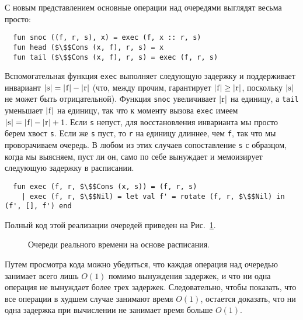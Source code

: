 С новым представлением основные операции над очередями выглядят весьма
просто:
\begin{lstlisting}
  fun snoc ((f, r, s), x) = exec (f, x :: r, s)
  fun head ($\$$Cons (x, f), r, s) = x
  fun tail ($\$$Cons (x, f), r, s) = exec (f, r, s)
\end{lstlisting}
Вспомогательная функция \lstinline!exec! выполняет следующую задержку
и поддерживает инвариант $|\lstinline!s!| = |\lstinline!f!| -
|\lstinline!r!|$ (что, между прочим, гарантирует $|\lstinline!f!| \ge
|\lstinline!r!|$, поскольку $|\lstinline!s!|$ не может быть
отрицательной). Функция \lstinline!snoc! увеличивает $|\lstinline!r!|$
на единицу, а \lstinline!tail! уменьшает $|\lstinline!f!|$ на единицу,
так что к моменту вызова \lstinline!exec! имеем $|\lstinline!s!| =
|\lstinline!f!| - |\lstinline!r!| + 1$. Если \lstinline!s! непуст,
для восстановления инварианта мы просто берем хвост
\lstinline!s!. Если же \lstinline!s! пуст, то \lstinline!r! на
единицу длиннее, чем \lstinline!f!, так что мы проворачиваем
очередь. В любом из этих случаев сопоставление \lstinline!s! с
образцом, когда мы выясняем, пуст ли он, само по себе вынуждает и мемоизирует
следующую задержку в расписании.
\begin{lstlisting}
  fun exec (f, r, $\$$Cons (x, s)) = (f, r, s)
    | exec (f, r, $\$$Nil) = let val f' = rotate (f, r, $\$$Nil) in (f', [], f') end
\end{lstlisting}
Полный код этой реализации очередей приведен на Рис.~\ref{fig:7.1}.

\begin{figure}
  \centering

  \caption{Очереди реального времени на основе расписания.}
  \label{fig:7.1}
\end{figure}

Путем просмотра кода можно убедиться, что каждая операция над очередью
занимает всего лишь $O(1)$ помимо вынуждения задержек, и что ни одна
операция не вынуждает более трех задержек.  Следовательно, чтобы
показать, что все операции в худшем случае занимают время $O(1)$,
остается доказать, что ни одна задержка при вычислении не занимает
время больше $O(1)$.

